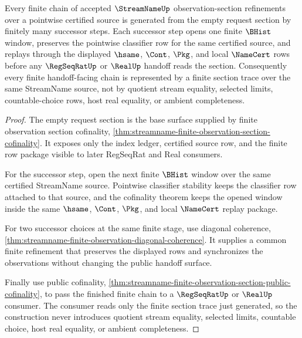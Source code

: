 \begin{theorem}
\label{thm:streamname-finite-observation-section-induction}
Every finite chain of accepted $\StreamNameUp$ observation-section refinements over a pointwise certified source is generated from the empty request section by finitely many successor steps. Each successor step opens one finite $\BHist$ window, preserves the pointwise classifier row for the same certified source, and replays through the displayed $\hsame$, $\Cont$, $\Pkg$, and local $\NameCert$ rows before any $\RegSeqRatUp$ or $\RealUp$ handoff reads the section. Consequently every finite handoff-facing chain is represented by a finite section trace over the same StreamName source, not by quotient stream equality, selected limits, countable-choice rows, host real equality, or ambient completeness.
\end{theorem}
\begin{proof}
The empty request section is the base surface supplied by finite observation section cofinality, \autoref{thm:streamname-finite-observation-section-cofinality}. It exposes only the index ledger, certified source row, and the finite row package visible to later RegSeqRat and Real consumers.

For the successor step, open the next finite $\BHist$ window over the same certified StreamName source. Pointwise classifier stability keeps the classifier row attached to that source, and the cofinality theorem keeps the opened window inside the same $\hsame$, $\Cont$, $\Pkg$, and local $\NameCert$ replay package.

For two successor choices at the same finite stage, use diagonal coherence, \autoref{thm:streamname-finite-observation-diagonal-coherence}. It supplies a common finite refinement that preserves the displayed rows and synchronizes the observations without changing the public handoff surface.

Finally use public cofinality, \autoref{thm:streamname-finite-observation-section-public-cofinality}, to pass the finished finite chain to a $\RegSeqRatUp$ or $\RealUp$ consumer. The consumer reads only the finite section trace just generated, so the construction never introduces quotient stream equality, selected limits, countable choice, host real equality, or ambient completeness.
\end{proof}

